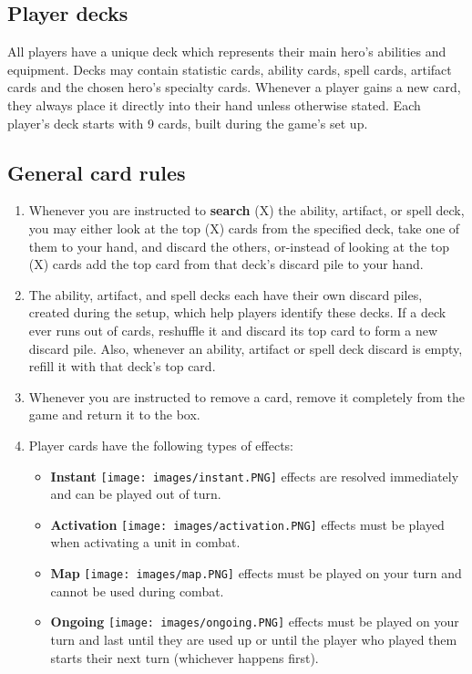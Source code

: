 \documentclass[12pt]{article}
\begin{document}
\clearpage
\subsection*{\hypertarget{Playerdecks}{Player decks}}
All players have a unique deck which represents their main hero's abilities and equipment. Decks may contain statistic cards, ability cards, spell cards, artifact cards and the chosen hero’s specialty cards. Whenever a player gains a new card, they always place it directly into their hand unless otherwise stated. Each player’s deck starts with 9 cards, built during the game’s set up.
\subsection*{General card rules}
\begin{enumerate}
    \item Whenever you are instructed to \textbf{search} (X) the ability, artifact, or spell deck, you may either look at the top (X) cards from the specified deck, take one of them to your hand, and discard the others, or-instead of looking at the top (X) cards add the top card from that deck’s discard pile to your hand.
    \item The ability, artifact, and spell decks each have their own discard piles, created during the setup, which help players identify these decks. If a deck ever runs out of cards, reshuffle it and discard its top card to form a new discard pile. Also, whenever an ability, artifact or spell deck discard is empty, refill it with that deck’s top card.
    \item Whenever you are instructed to remove a card, remove it completely from the game and return it to the box.
    \item Player cards have the following types of effects:
    \begin{itemize}
        \item \textbf{Instant} \texttt{[image: images/instant.PNG]} effects are resolved immediately and can be played out of turn.
        \item \textbf{Activation} \texttt{[image: images/activation.PNG]} effects must be played when activating a unit in combat.
        \item \textbf{Map} \texttt{[image: images/map.PNG]} effects must be played on your turn and cannot be used during combat.  
        \item \textbf{Ongoing} \texttt{[image: images/ongoing.PNG]} effects must be played on your turn and last until they are used up or until the player who played them starts their next turn (whichever happens first).

\end{itemize}
\end{enumerate}
\end{document}
